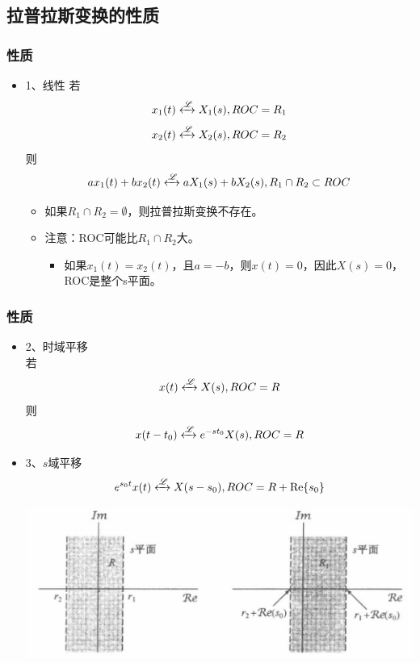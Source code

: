 \documentclass[CJKutf8,dvipsnames,table]{beamer}
\begin{document}
\begin{CJK*}{UTF8}{song}
  \section{拉普拉斯变换的性质}
  
  \begin{frame}
    \frametitle{性质}
    \begin{itemize}
    \item 1、线性
    若
    \[
    x_1(t) \xleftrightarrow{\mathscr{L}} X_1(s), ROC=R_1
    \]
    \[
    x_2(t) \xleftrightarrow{\mathscr{L}} X_2(s), ROC=R_2
    \]
    则
    \[
    ax_1(t)+bx_2(t) \xleftrightarrow{\mathscr{L}} aX_1(s)+bX_2(s), R_1 \cap R_2 \subset ROC 
    \]
    	\begin{itemize}
    	\item 如果$R_1 \cap R_2=\emptyset$，则拉普拉斯变换不存在。
   		\item 注意：ROC可能比$R_1 \cap R_2$大。
			\begin{itemize}
			\item 如果$x_1(t)=x_2(t)$，且$a=-b$，则$x(t)=0$，因此$X(s)=0$，ROC是整个s平面。
			\end{itemize}
    	\end{itemize}
    \end{itemize}
  \end{frame} 
    
  \begin{frame}
    \frametitle{性质}
    \begin{itemize}
    \item 2、时域平移 \\
    若
    \[
    x(t) \xleftrightarrow{\mathscr{L}} X(s), ROC=R
    \]
    则
    \[
    x(t-t_0) \xleftrightarrow{\mathscr{L}} e^{-st_0}X(s), ROC=R
    \]
    \item 3、$s$域平移 
    \[
    e^{s_0 t}x(t) \xleftrightarrow{\mathscr{L}} X(s-s_0), ROC=R+\operatorname{Re}\{s_0\}
    \]
    \begin{center}
      \includegraphics[scale=.5]{ss-c-f9-23}
    \end{center}
    \end{itemize}
  \end{frame}
      

\end{CJK*}
\end{document}

